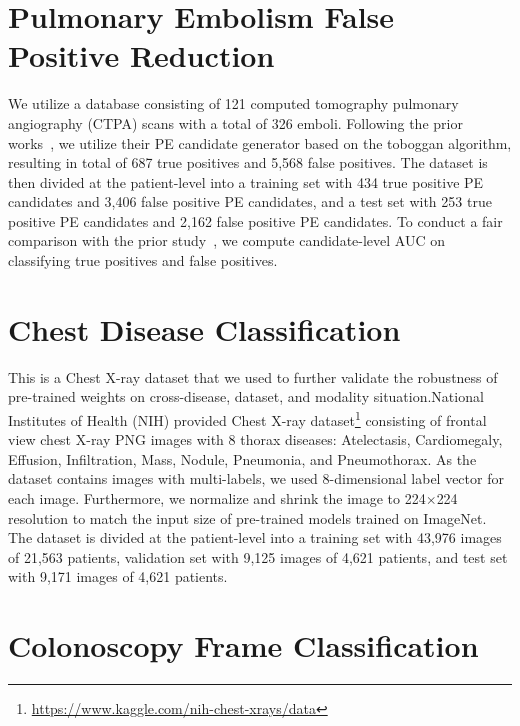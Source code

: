 \section*{Pulmonary Embolism False Positive Reduction}
\label{ap1:pulmonary_embolism_classification}

We utilize a database consisting of 121 computed tomography pulmonary angiography (CTPA) scans with a total of 326 emboli. 
Following the prior works~\citep{liang2007computer}, we utilize their PE candidate generator based on the toboggan algorithm, resulting in total of 687 true positives and 5,568 false positives. The dataset is then divided at the patient-level into a training set with 434 true positive PE candidates and 3,406 false positive PE candidates, and a test set with 253 true positive PE candidates and 2,162 false positive PE candidates. To conduct a fair comparison with the prior study~\citep{zhou2017fine,tajbakhsh2016convolutional,tajbakhsh2019computer}, we compute candidate-level AUC on classifying true positives and false positives.


\section*{Chest Disease Classification}
\label{ap1:chestxray}

This is a Chest X-ray dataset that we used to further validate the robustness of pre-trained weights on cross-disease, dataset, and modality situation.National Institutes of Health (NIH) provided Chest X-ray dataset\footnote{\href{https://www.kaggle.com/nih-chest-xrays/data}{https://www.kaggle.com/nih-chest-xrays/data}}\citep{wang2017chestx} consisting of frontal view chest X-ray PNG images with 8 thorax diseases:  Atelectasis, Cardiomegaly, Effusion, Infiltration, Mass, Nodule, Pneumonia, and Pneumothorax. As the dataset contains images with multi-labels, we used 8-dimensional label vector for each image. Furthermore, we normalize and shrink the image to 224$\times$224 resolution to match the input size of pre-trained models trained on ImageNet. The dataset is divided at the patient-level into a training set with 43,976 images of 21,563 patients, validation set with 9,125 images of 4,621 patients, and test set with 9,171 images of 4,621 patients.


\section*{Colonoscopy Frame Classification}
\label{ap1:colonoscopy_frame_classification}

